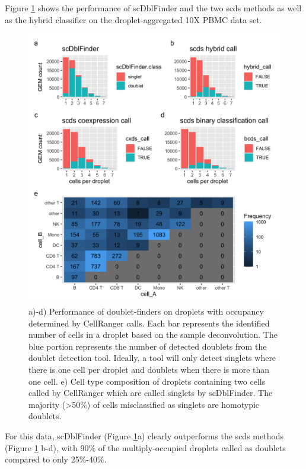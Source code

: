 \documentclass[unnumsec,webpdf,modern,large]{oup-authoring-template}
\begin{document}
	Figure \ref{fig:doublet_finder_comparison} shows the performance of scDblFinder and the two scds methods as well as the hybrid classifier on the droplet-aggregated 10X PBMC data set.	 
	\begin{figure}
		\begin{center}
			\includegraphics[scale=0.08 ]{figures/doublet_finder_comparison_extra.png} 
			\caption{ a)-d) Performance of doublet-finders on droplets with occupancy determined by CellRanger calls. 
			Each bar represents the identified number of cells in a droplet based on the sample deconvolution. 
			The blue portion represents the number of detected doublets from the doublet detection tool.
			Ideally, a tool will only detect singlets where there is one cell per droplet and doublets when there is more than one cell.  
			e) Cell type composition of droplets containing two cells called by CellRanger which are called singlets by scDblFinder. The majority (>50\%) of cells misclassified as singlets are homotypic doublets.
			}
			\label{fig:doublet_finder_comparison}
		\end{center}
	\end{figure}
	For this data, scDblFinder (Figure \ref{fig:doublet_finder_comparison}a) clearly outperforms the scds methods (Figure \ref{fig:doublet_finder_comparison} b-d), with 90\% of the multiply-occupied droplets called as doublets compared to only 25\%-40\%. 
\end{document}

